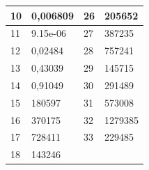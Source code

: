 \documentclass[11pt]{article}
\begin{document}
\begin{figure}[H]
\begin{minipage}{0.5\textwidth}
\begin{tabular}{|l|l|l|l|}
            10 & 0,006809 & 26 & 205652 \\ \hline
            11 & 9.15e-06 & 27 & 387235 \\ \hline
            12 & 0,02484 & 28 & 757241 \\ \hline
            13 & 0,43039 & 29 & 145715 \\ \hline
            14 & 0,91049 & 30 & 291489 \\ \hline
            15 & 180597 & 31 & 573008 \\ \hline
            16 & 370175 & 32 & 1279385 \\ \hline
            17 & 728411 & 33 & 229485 \\ \hline
            18 & 143246 & ~ & \\ \hline
        \end{tabular}
    \end{minipage}
\end{figure}
\end{document}
